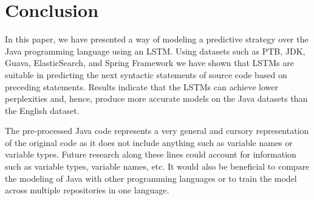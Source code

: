 \documentclass[runningheads,a4paper]{llncs}
\begin{document}
\section{Conclusion}

In this paper, we have presented a way of modeling a predictive strategy
over the Java programming language using an LSTM. Using datasets such as PTB,
JDK, Guava, ElasticSearch, and Spring Framework we have shown that
LSTMs are suitable in predicting the next syntactic statements of source
code based on preceding statements. Results indicate that the
LSTMs can achieve lower perplexities and, hence, produce more accurate models
on the Java datasets than the English dataset.

The pre-processed Java code represents a very general and cursory
representation of the original code as it does not include anything such
as variable names or variable types. Future research along these lines
could account for information such as variable types, variable names, etc.
It would also be beneficial to compare the modeling of Java with other
programming languages or to train the model across multiple repositories
in one language.
\end{document}
